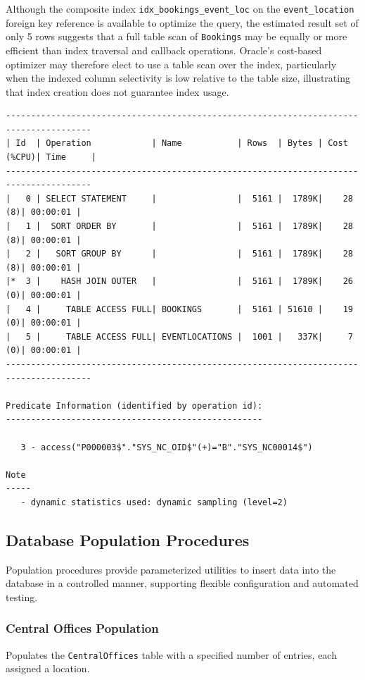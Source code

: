 Although the composite index \texttt{idx\_bookings\_event\_loc} on the \texttt{event\_location} foreign key reference is available to optimize the query, the estimated result set of only 5 rows suggests that a full table scan of \texttt{Bookings} may be equally or more efficient than index traversal and callback operations. Oracle's cost-based optimizer may therefore elect to use a table scan over the index, particularly when the indexed column selectivity is low relative to the table size, illustrating that index creation does not guarantee index usage.

{\scriptsize
\begin{verbatim}
---------------------------------------------------------------------------------------
| Id  | Operation            | Name           | Rows  | Bytes | Cost (%CPU)| Time     |
---------------------------------------------------------------------------------------
|   0 | SELECT STATEMENT     |                |  5161 |  1789K|    28   (8)| 00:00:01 |
|   1 |  SORT ORDER BY       |                |  5161 |  1789K|    28   (8)| 00:00:01 |
|   2 |   SORT GROUP BY      |                |  5161 |  1789K|    28   (8)| 00:00:01 |
|*  3 |    HASH JOIN OUTER   |                |  5161 |  1789K|    26   (0)| 00:00:01 |
|   4 |     TABLE ACCESS FULL| BOOKINGS       |  5161 | 51610 |    19   (0)| 00:00:01 |
|   5 |     TABLE ACCESS FULL| EVENTLOCATIONS |  1001 |   337K|     7   (0)| 00:00:01 |
---------------------------------------------------------------------------------------

Predicate Information (identified by operation id):
---------------------------------------------------
 
   3 - access("P000003$"."SYS_NC_OID$"(+)="B"."SYS_NC00014$")
 
Note
-----
   - dynamic statistics used: dynamic sampling (level=2)
\end{verbatim}
}

\subsection{Database Population Procedures}

Population procedures provide parameterized utilities to insert data into the database in a controlled manner, supporting flexible configuration and automated testing.

\subsubsection{Central Offices Population}
Populates the \texttt{CentralOffices} table with a specified number of entries, each assigned a location.

